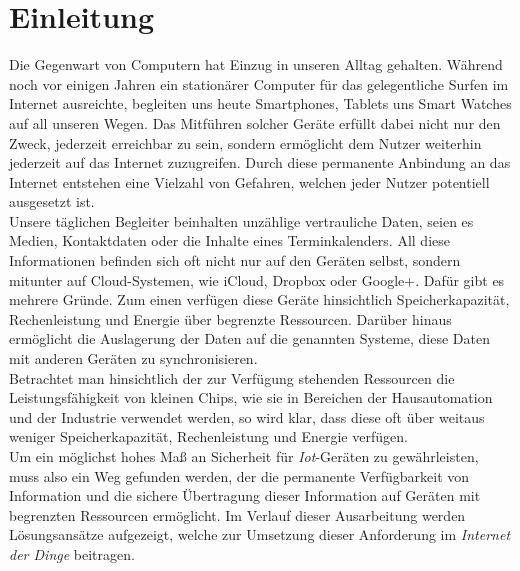 \documentclass[conference]{IEEEtran}
\begin{document}
\section{Einleitung}
Die Gegenwart von Computern hat Einzug in unseren Alltag gehalten. Während noch vor einigen Jahren ein stationärer Computer für das gelegentliche Surfen im Internet ausreichte, begleiten uns heute Smartphones, Tablets uns Smart Watches auf all unseren Wegen. Das Mitführen solcher Geräte erfüllt dabei nicht nur den Zweck, jederzeit erreichbar zu sein, sondern ermöglicht dem Nutzer weiterhin jederzeit auf das Internet zuzugreifen. Durch diese permanente Anbindung an das Internet entstehen eine Vielzahl von Gefahren, welchen jeder Nutzer potentiell ausgesetzt ist. \\
Unsere täglichen Begleiter beinhalten unzählige vertrauliche Daten, seien es Medien, Kontaktdaten oder die Inhalte eines Terminkalenders. All diese Informationen befinden sich oft nicht nur auf den Geräten selbst, sondern mitunter auf Cloud-Systemen, wie iCloud, Dropbox oder Google+. Dafür gibt es mehrere Gründe. Zum einen verfügen diese Geräte hinsichtlich Speicherkapazität, Rechenleistung und Energie über begrenzte Ressourcen. Darüber hinaus ermöglicht die Auslagerung der Daten auf die genannten Systeme, diese Daten mit anderen Geräten zu synchronisieren. \\
Betrachtet man hinsichtlich der zur Verfügung stehenden Ressourcen die Leistungsfähigkeit von kleinen Chips, wie sie in Bereichen der Hausautomation und der Industrie verwendet werden, so wird klar, dass diese oft über weitaus weniger Speicherkapazität, Rechenleistung und Energie verfügen. \\
Um ein möglichst hohes Maß an Sicherheit für \textit{Iot}-Geräten zu gewährleisten, muss also ein Weg gefunden werden, der die permanente Verfügbarkeit von Information und die sichere Übertragung dieser Information auf Geräten mit begrenzten Ressourcen ermöglicht. Im Verlauf dieser Ausarbeitung werden Lösungsansätze aufgezeigt, welche zur Umsetzung dieser Anforderung im \textit{Internet der Dinge} beitragen.


 


\end{document}
